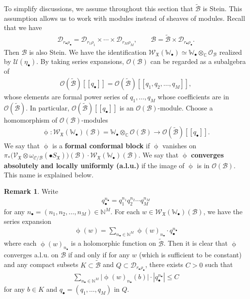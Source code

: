 \documentclass[12pt,b5paper,notitlepage]{report}
\theoremstyle{definition}
\newtheorem{rem}[df]{Remark}
\theoremstyle{plain}
\newcommand{\fk}{\mathfrak}
\newcommand{\mc}{\mathcal}
\newcommand{\wtd}{\widetilde}
\newcommand{\scr}{\mathscr}
\newcommand{\blt}{\bullet}
\newcommand{\Wbb}{\mathbb W}
\newcommand{\Cbb}{\mathbb C}
\newcommand{\Nbb}{\mathbb N}
\numberwithin{equation}{section}
\begin{document}
To simplify discussions, we assume throughout this section that $\wtd{\mc B}$ is Stein. This assumption allows us to work with modules instead of sheaves of modules. Recall that we have
\begin{align*}
\mc D_{r_\bullet\rho_\bullet}=\mc D_{r_1\rho_1}\times\cdots\times\mc D_{r_M\rho_M},\qquad\mc B=\wtd{\mc B}\times \mc D_{r_\bullet\rho_\bullet}.
\end{align*}
Then $\mc B$ is also Stein.  We have the identification $\scr W_{\fk X}(\Wbb_\blt)\simeq \Wbb_\blt\otimes_{\Cbb}\scr O_{\mc B}$ realized by $\mc U(\eta_\blt)$. By taking series expansions,  $\scr O(\mc B)$ can be regarded as a subalgebra of
\begin{align*}
\scr O(\wtd{\mc B})[[q_\blt]]=\scr O(\wtd{\mc B})[[q_1,q_2,\dots,q_M]],
\end{align*}
whose elements are formal power series of $q_1,\dots,q_M$ whose coefficients are in $\scr O(\wtd{\mc B})$. In particular, $\scr O(\wtd{\mc B})[[q_\blt]]$ is an $\scr O(\mc B)$-module. Choose a homomorphism of $\scr O(\mc B)$-modules
\begin{align}
\upphi:\scr W_{\fk X}(\Wbb_\blt)(\mc B)=\Wbb_\blt\otimes_\Cbb\scr O(\mc B)\rightarrow\scr O(\wtd{\mc B})[[q_\blt]].\label{eq102}
\end{align}
We say that $\upphi$ is a \textbf{formal conformal block} if $\upphi$ vanishes on $\pi_*\big(\scr V_{\fk X}\otimes\omega_{\mc C/\mc B}(\blt S_{\fk X})\big)(\mc B)\cdot \scr W_{\fk X}(\Wbb_\blt)(\mc B)$. We say that $\upphi$ \textbf{converges absolutely and locally uniformly (a.l.u.)} if the image of $\upphi$ is in $\scr O(\mc B)$. This name is explained below.

\begin{rem}\label{lb77}
Write
\begin{align*}
q_\blt^{n_\blt}=q_1^{n_1}q_2^{n_2}\cdots q_M^{n_M}
\end{align*}
for any $n_\blt=(n_1,n_2,\dots,n_M)\in\Nbb^M$. For each $w\in \scr W_{\fk X}(\Wbb_\blt)(\mc B)$, we have the series expansion
\begin{align*}
\upphi(w)=\sum_{n_\blt\in\Nbb^M}\upphi(w)_{n_\blt}\cdot q_\blt^{n_\blt}
\end{align*}
where each $\upphi(w)_{n_\blt}$ is a holomorphic function on $\wtd{\mc B}$. Then it is clear that  $\upphi$ converges a.l.u. on $\mc B$ if and only if for any $w$ (which is sufficient to be constant) and any  compact subsets $K\subset\wtd{\mc B}$ and $Q\subset\mc D_{r_\blt\rho_\blt}$,  there exists $C>0$ such that
\begin{align}
\sum_{n_\blt\in\Nbb^M}\big|\upphi(w)_{n_\blt}(b)\big|\cdot |q_\blt^{n_\blt}|\leq C
\end{align}
for any $b\in K$ and $q_\blt=(q_1,\dots,q_M)$ in $Q$. 
\end{rem}
\end{document}
